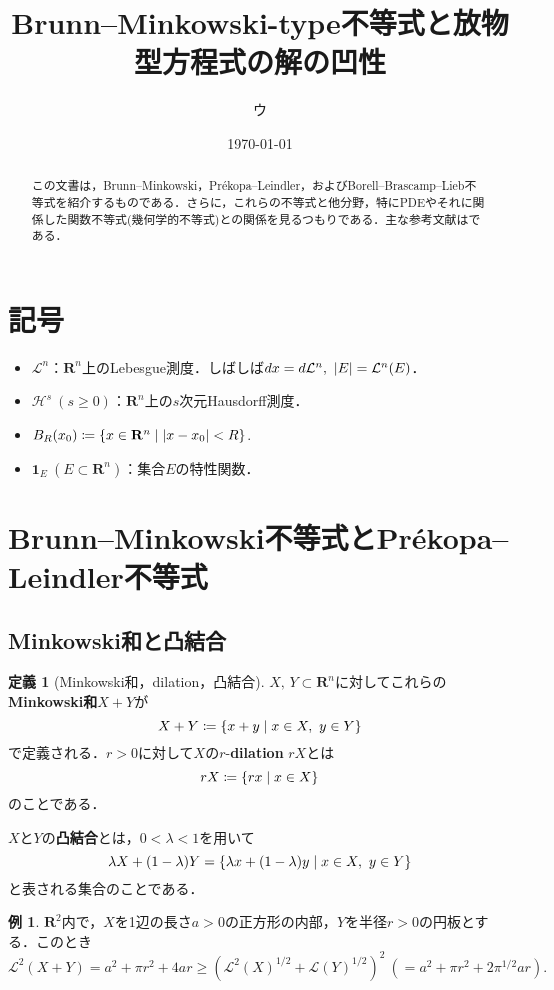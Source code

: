 \documentclass[a4j]{ltjsarticle}
\newcommand{\Rset}{\mathbf{R}}
\newcommand{\Lm}{\mathcal{L}}
\newcommand{\Hm}{\mathcal{H}}
\newcommand{\1}{\bm{1}}
\numberwithin{equation}{section}
\theoremstyle{definition}
\newtheorem{dfn}[thm]{定義}
\newtheorem{eg}[thm]{例}
\begin{document}
\title{Brunn--Minkowski-type不等式と放物型方程式の解の凹性}
\author{ウ}
\date{\today}
\maketitle
\begin{abstract}
    この文書は，Brunn--Minkowski，Pr\'ekopa--Leindler，およびBorell--Brascamp--Lieb不等式を紹介するものである．さらに，これらの不等式と他分野，特にPDEやそれに関係した関数不等式(幾何学的不等式)との関係を見るつもりである．主な参考文献は\cites{BL,G,ILS}である．
\end{abstract}
\tableofcontents
\section*{記号}
\begin{itemize}
    \item $\Lm^n$：$\Rset^n$上のLebesgue測度．しばしば$dx=d\Lm^n,\ \abs{E}=\Lm^n(E)$．
    \item $\Hm^s\ (s\geq0)$：$\Rset^n$上の$s$次元Hausdorff測度．
    \item $B_R(x_0)\coloneqq \qty{x\in \Rset^n \mid \abs{x-x_0}<R}$.
    \item $\1_E\ (E\subset \Rset^n)$：集合$E$の特性関数．
\end{itemize}
\section{Brunn--Minkowski不等式とPr\'ekopa--Leindler不等式}
\subsection{Minkowski和と凸結合}
\begin{dfn}[Minkowski和，dilation，凸結合]
$X,\,Y\subset \Rset^n$に対してこれらの\textbf{Minkowski和}$X+Y$が
    \begin{equation}
        X+Y\coloneqq \qty{x+y\mid x\in X,\ y\in Y}
    \end{equation}
    で定義される．$r>0$に対して$X$の$r$-\textbf{dilation} $rX$とは 
    \begin{equation}
        rX\coloneqq \qty{rx\mid x\in X}
    \end{equation}
    のことである．
    
    $X$と$Y$の\textbf{凸結合}とは，$0<\lambda<1$を用いて
    \begin{equation}
        \lambda X+(1-\lambda)Y=\qty{\lambda x+(1-\lambda )y\mid x\in X,\ y\in Y}
    \end{equation}
    と表される集合のことである．
\end{dfn}
\begin{eg}
    $\Rset^2$内で，$X$を1辺の長さ$a>0$の正方形の内部，$Y$を半径$r>0$の円板とする．このとき
    \begin{equation}
        \Lm^2(X+Y)=a^2+\pi r^2+4ar\geq (\Lm^2(X)^{1/2}+\Lm(Y)^{1/2})^{2}\ (=a^2+\pi r^2+2\pi^{1/2}ar).
    \end{equation}
\end{eg}
\end{document}
